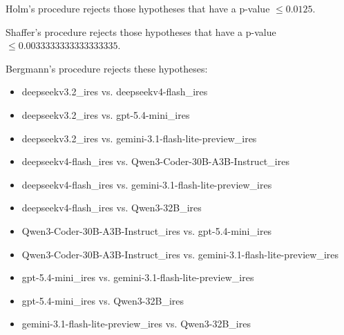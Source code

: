 \documentclass[a4paper,10pt]{article}
\begin{document}
\begin{landscape}
Holm's procedure rejects those hypotheses that have a p-value $\le0.0125$.


Shaffer's procedure rejects those hypotheses that have a p-value $\le0.0033333333333333335$.


Bergmann's procedure rejects these hypotheses:


\begin{itemize}


\item deepseekv3.2_ires vs. deepseekv4-flash_ires\item deepseekv3.2_ires vs. gpt-5.4-mini_ires\item deepseekv3.2_ires vs. gemini-3.1-flash-lite-preview_ires\item deepseekv4-flash_ires vs. Qwen3-Coder-30B-A3B-Instruct_ires\item deepseekv4-flash_ires vs. gemini-3.1-flash-lite-preview_ires\item deepseekv4-flash_ires vs. Qwen3-32B_ires\item Qwen3-Coder-30B-A3B-Instruct_ires vs. gpt-5.4-mini_ires\item Qwen3-Coder-30B-A3B-Instruct_ires vs. gemini-3.1-flash-lite-preview_ires\item gpt-5.4-mini_ires vs. gemini-3.1-flash-lite-preview_ires\item gpt-5.4-mini_ires vs. Qwen3-32B_ires\item gemini-3.1-flash-lite-preview_ires vs. Qwen3-32B_ires\end{itemize}



\end{landscape}
\end{document}
